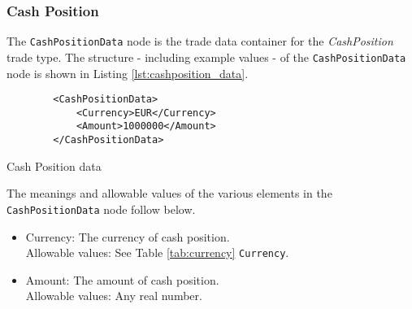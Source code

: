 \subsubsection{Cash Position}

The \lstinline!CashPositionData!  node is the trade data container for the \emph{CashPosition} trade type.  The structure -
including example values - of the \lstinline!CashPositionData!  node is shown in Listing \ref{lst:cashposition_data}.

\begin{listing}[H]
\begin{verbatim}
        <CashPositionData>
            <Currency>EUR</Currency>
            <Amount>1000000</Amount>
        </CashPositionData>
\end{verbatim}
\caption{Cash Position data}
\label{lst:cashposition_data}
\end{listing}

The meanings and allowable values of the various elements in the \lstinline!CashPositionData!  node follow below.

\begin{itemize}
\item Currency: The currency of cash position.  \\ Allowable values:  See Table \ref{tab:currency}  \lstinline!Currency!.
\item Amount: The amount of cash position.  \\ Allowable values:  Any real number.
\end{itemize}
